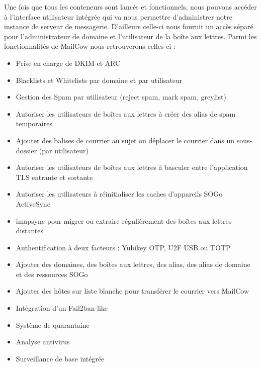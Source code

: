 \documentclass[oneside,12pt]{report}
\begin{document}
Une fois que tous les conteneurs sont lancés et fonctionnels, nous pouvons accéder à l'interface utilisateur intégrée qui va nous permettre d'administrer notre instance de serveur de messagerie. D'ailleurs celle-ci nous fournit un accès séparé pour l'administrateur de domaine et l'utilisateur de la boîte aux lettres. Parmi les fonctionnalités de MailCow nous retrouverons celles-ci :

\begin{itemize}

    \item Prise en charge de DKIM et ARC
    
    \item Blacklists et Whitelists par domaine et par utilisateur
    
    \item Gestion des Spam par utilisateur (reject spam, mark spam, greylist)
    
    \item Autoriser les utilisateurs de boîtes aux lettres à créer des alias de spam temporaires
    
    \item Ajouter des balises de courrier au sujet ou déplacer le courrier dans un sous-dossier (par utilisateur)
    
    \item Autoriser les utilisateurs de boîtes aux lettres à basculer entre l'application TLS entrante et sortante
    
    \item Autoriser les utilisateurs à réinitialiser les caches d'appareils SOGo ActiveSync

    \item imapsync pour migrer ou extraire régulièrement des boîtes aux lettres distantes
    
    \item Authentification à deux facteurs : Yubikey OTP, U2F USB ou TOTP
    
    \item Ajouter des domaines, des boîtes aux lettres, des alias, des alias de domaine et des ressources SOGo
    
    \item Ajouter des hôtes sur liste blanche pour transférer le courrier vers MailCow
    
    \item Intégration d'un Fail2ban-like
    
    \item Système de quarantaine

    \item Analyse antivirus
    
    \item Surveillance de base intégrée
    
\end{itemize}
\end{document}
